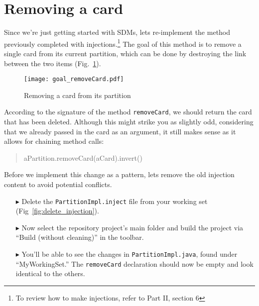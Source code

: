 \newpage
\genHeader
\section{Removing a card}
\hypertarget{sec:remCard}{}

Since we're just getting started with SDMs, lets re-implement the method previously completed with injections.\footnote{To review how to make
injections, refer to Part II, section 6} The goal of this method is to remove a single card from its current partition, which can be done by destroying the link
between the two items (Fig.~\ref{fig:goal_removeCard}).

\vspace{0.5cm}

\begin{figure}[htbp]
	\centering
    \texttt{[image: goal\_removeCard.pdf]}
	\caption{Removing a card from its partition}
	\label{fig:goal_removeCard}
\end{figure}
\FloatBarrier

\vspace{0.5cm}

According to the signature of the method \texttt{removeCard}, we should return the card that has been deleted. Although this might strike you as slightly odd,
considering that we already passed in the card as an argument, it still makes sense as it allows for chaining method calls:
{ \begin{quote} \small aPartition.removeCard(aCard).invert() \end{quote} }

Before we implement this change as a pattern, lets remove the old injection content to avoid potential conflicts.

\begin{itemize}

\item[$\blacktriangleright$] Delete the \texttt{PartitionImpl.inject} file from your working set (Fig~\ref{fig:delete_injection}).

\item[$\blacktriangleright$] Now select the repository project's main folder and build the project via ``Build (without cleaning)'' in the toolbar.

\item[$\blacktriangleright$] You'll be able to see the changes in \texttt{PartitionImpl.java}, found under ``MyWorkingSet.'' The \texttt{removeCard}
declaration should now be empty and look identical to the others.

\end{itemize}

